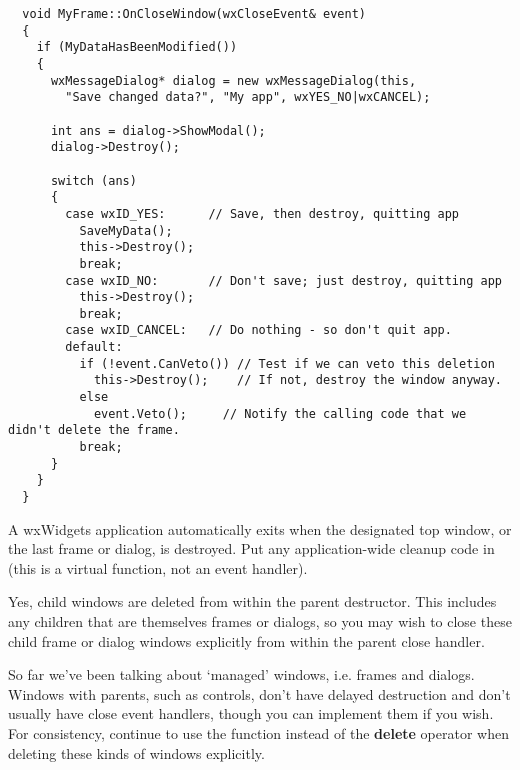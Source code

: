{\small%
\begin{verbatim}
  void MyFrame::OnCloseWindow(wxCloseEvent& event)
  {
    if (MyDataHasBeenModified())
    {
      wxMessageDialog* dialog = new wxMessageDialog(this,
        "Save changed data?", "My app", wxYES_NO|wxCANCEL);

      int ans = dialog->ShowModal();
      dialog->Destroy();

      switch (ans)
      {
        case wxID_YES:      // Save, then destroy, quitting app
          SaveMyData();
          this->Destroy();
          break;
        case wxID_NO:       // Don't save; just destroy, quitting app
          this->Destroy();
          break;
        case wxID_CANCEL:   // Do nothing - so don't quit app.
        default:
          if (!event.CanVeto()) // Test if we can veto this deletion
            this->Destroy();    // If not, destroy the window anyway.
          else
            event.Veto();     // Notify the calling code that we didn't delete the frame.
          break;
      }
    }
  }
\end{verbatim}
}%


A wxWidgets application automatically exits when the designated top window, or the
last frame or dialog, is destroyed. Put any application-wide cleanup code in  (this
is a virtual function, not an event handler).


Yes, child windows are deleted from within the parent destructor. This includes any children
that are themselves frames or dialogs, so you may wish to close these child frame or dialog windows
explicitly from within the parent close handler.


So far we've been talking about `managed' windows, i.e. frames and dialogs. Windows
with parents, such as controls, don't have delayed destruction and don't usually have
close event handlers, though you can implement them if you wish. For consistency,
continue to use the  function instead
of the {\bf delete} operator when deleting these kinds of windows explicitly.

